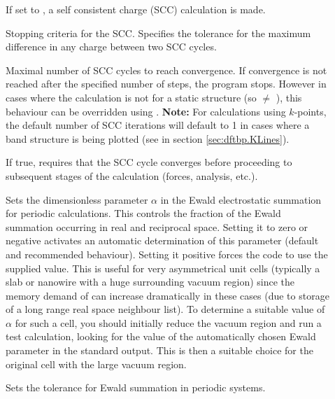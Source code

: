 \begin{description}
\item[] If set to , a self consistent charge (SCC)
  calculation is made.

\item[] Stopping criteria for the SCC.  Specifies the
  tolerance for the maximum difference in any charge between two SCC
  cycles.

\item[] Maximal number of SCC cycles to reach
  convergence. If convergence is not reached after the specified
  number of steps, the program stops. However in cases where the
  calculation is not for a static structure (so  $\neq$
  \cb), this behaviour can be overridden using
  . {\bf Note:} For calculations using
  $k$-points, the default number of SCC iterations will default to 1
  in cases where a band structure is being plotted (see 
  in section \ref{sec:dftbp.KLines}).

\item[] If true, requires that the SCC cycle converges
  before proceeding to subsequent stages of the calculation (forces, analysis,
  etc.).

\item[] Sets the dimensionless parameter $\alpha$
  in the Ewald electrostatic summation for periodic calculations. This
  controls the fraction of the Ewald summation occurring in real and
  reciprocal space. Setting it to zero or negative activates an
  automatic determination of this parameter (default and recommended
  behaviour). Setting it positive forces the code to use the supplied
  value. This is useful for very asymmetrical unit cells
  (typically a slab or nanowire with a huge surrounding vacuum region)
  since the memory demand of \dftbp{} can increase dramatically in
  these cases (due to storage of a long range real space neighbour
  list). To determine a suitable value of $\alpha$ for such a cell,
  you should initially reduce the vacuum region and run a test
  calculation, looking for the value of the automatically chosen Ewald
  parameter in the standard output. This is then a suitable choice for
  the original cell with the large vacuum region.

\item[] Sets the tolerance for Ewald summation in periodic
  systems.


\end{description}
